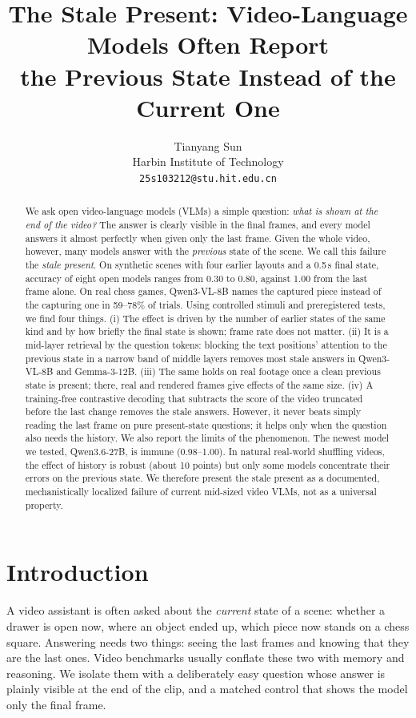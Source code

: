 \documentclass[10pt,twocolumn,letterpaper]{article}
\title{The Stale Present: Video-Language Models Often Report\\the Previous State Instead of the Current One}
\author{Tianyang Sun\\
Harbin Institute of Technology\\
{\tt\small 25s103212@stu.hit.edu.cn}
}
\begin{document}
\maketitle

\begin{abstract}
We ask open video-language models (VLMs) a simple question: \emph{what is shown at the end of the video?} The answer is clearly visible in the final frames, and every model answers it almost perfectly when given only the last frame. Given the whole video, however, many models answer with the \emph{previous} state of the scene. We call this failure the \emph{stale present}. On synthetic scenes with four earlier layouts and a 0.5\,s final state, accuracy of eight open models ranges from 0.30 to 0.80, against 1.00 from the last frame alone. On real chess games, Qwen3-VL-8B names the captured piece instead of the capturing one in 59--78\% of trials. Using controlled stimuli and preregistered tests, we find four things. (i) The effect is driven by the number of earlier states of the same kind and by how briefly the final state is shown; frame rate does not matter. (ii) It is a mid-layer retrieval by the question tokens: blocking the text positions' attention to the previous state in a narrow band of middle layers removes most stale answers in Qwen3-VL-8B and Gemma-3-12B. (iii) The same holds on real footage once a clean previous state is present; there, real and rendered frames give effects of the same size. (iv) A training-free contrastive decoding that subtracts the score of the video truncated before the last change removes the stale answers. However, it never beats simply reading the last frame on pure present-state questions; it helps only when the question also needs the history. We also report the limits of the phenomenon. The newest model we tested, Qwen3.6-27B, is immune (0.98--1.00). In natural real-world shuffling videos, the effect of history is robust (about 10 points) but only some models concentrate their errors on the previous state. We therefore present the stale present as a documented, mechanistically localized failure of current mid-sized video VLMs, not as a universal property.
\end{abstract}

\section{Introduction}

A video assistant is often asked about the \emph{current} state of a scene: whether a drawer is open now, where an object ended up, which piece now stands on a chess square. Answering needs two things: seeing the last frames and knowing that they are the last ones. Video benchmarks usually conflate these two with memory and reasoning. We isolate them with a deliberately easy question whose answer is plainly visible at the end of the clip, and a matched control that shows the model only the final frame.
\end{document}
